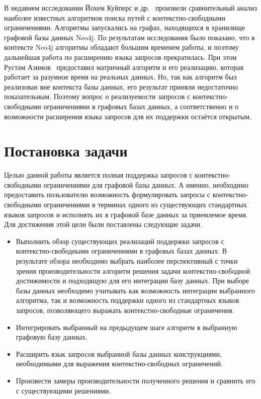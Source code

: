 В недавнем исследовании Йохем Куйперс и др.~\cite{Kuijpers:2019:ESC:3335783.3335791} произвели сравнительный анализ наиболее известных алгоритмов поиска путей с конте\-кстно-свободными ограничениями. Алгоритмы запускались на графах, находящихся в хранилище графовой базы данных Neo4j. По результатам исследования было показано, что в контексте Neo4j алгоритмы обладают большим временем работы, и поэтому дальнейшая работа по расширению языка запросов прекратилась. При этом Рустам Азимов~\cite{Azimov:2018:CPQ:3210259.3210264} предоставил матричный алгоритм и его реализацию, которая работает за разумное время на реальных данных. Но, так как алгоритм был реализован вне контекста базы данных, его результат приняли недостаточно показательным. Поэтому вопрос о реализуемости запросов с контекстно-свободными ограничениями в графовых базах данных, а соответственно и о возможности расширения языка запросов для их поддержки остаётся открытым.

\section{Постановка задачи}
Целью данной работы является полная поддержка запросов с конте\-кстно-свободными ограничениями для графовой базы данных. А именно, необходимо предоставить пользователю возможность формулировать запросы с контекстно-свободными ограничениями в терминах одного из существующих стандартных языков запросов и исполнять их в графовой базе данных за приемлемое время. Для достижения этой цели были поставлены следующие задачи.

\begin{itemize}
    \item Выполнить обзор существующих реализаций поддержки запросов с контекстно-свободными ограничениями в графовых базах данных. В результате обзора необходимо выбрать наиболее перспективный с точки зрения производительности алгоритм решения задачи контекстно-свободной достижимости и подходящую для его интеграции базу данных. При выборе базы данных необходимо учитывать как возможность интеграции выбранного алгоритма, так и возможность поддержки одного из стандартных языков запросов, позволяющего выражать контекстно-свободные ограничения.
    \item Интегрировать выбранный на предыдущем шаге алгоритм в выбранную графовую базу данных.
    \item Расширить язык запросов выбранной базы данных конструкциями, необходимыми для выражения контекстно-свободных ограничений.
    \item Произвести замеры производительности полученного решения и сравнить его с существующими решениями.
\end{itemize}


